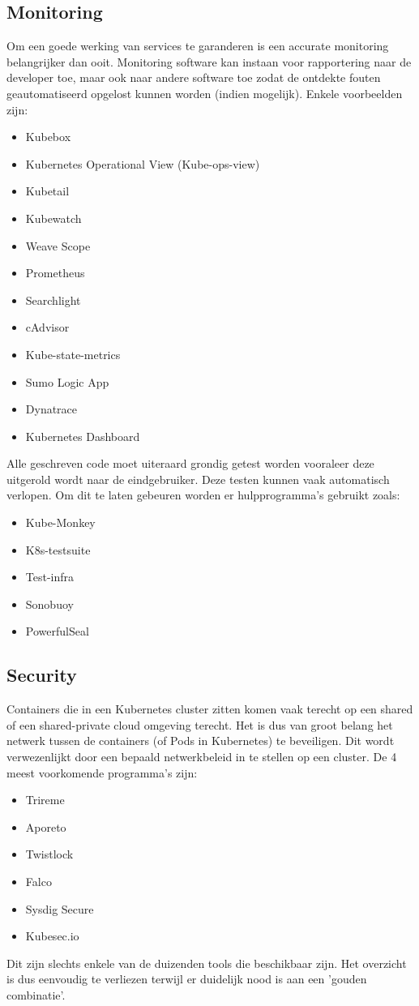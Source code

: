 \subsection{Monitoring}
Om een goede werking van services te garanderen is een accurate monitoring belangrijker dan ooit. Monitoring software kan instaan voor rapportering naar de developer toe, maar ook naar andere software toe zodat de ontdekte fouten geautomatiseerd opgelost kunnen worden (indien mogelijk). Enkele voorbeelden zijn:
\begin{itemize}
    \item Kubebox
    \item Kubernetes Operational View (Kube-ops-view)
    \item Kubetail
    \item Kubewatch
    \item Weave Scope
    \item Prometheus
    \item Searchlight
    \item cAdvisor
    \item Kube-state-metrics
    \item Sumo Logic App
    \item Dynatrace
    \item Kubernetes Dashboard
\end{itemize}
Alle geschreven code moet uiteraard grondig getest worden vooraleer deze uitgerold wordt naar de eindgebruiker. Deze testen kunnen vaak automatisch verlopen. Om dit te laten gebeuren worden er hulpprogramma's gebruikt zoals:
\begin{itemize}
    \item Kube-Monkey
    \item K8s-testsuite
    \item Test-infra
    \item Sonobuoy
    \item PowerfulSeal
\end{itemize}
\subsection{Security}
Containers die in een Kubernetes cluster zitten komen vaak terecht op een shared of een shared-private cloud omgeving terecht. Het is dus van groot belang het netwerk tussen de containers (of Pods in Kubernetes) te beveiligen. Dit wordt verwezenlijkt door een bepaald netwerkbeleid in te stellen op een cluster. De 4 meest voorkomende programma's zijn:
\begin{itemize}
    \item Trireme
    \item Aporeto
    \item Twistlock
    \item Falco
    \item Sysdig Secure
    \item Kubesec.io
\end{itemize}  
Dit zijn slechts enkele van de duizenden tools die beschikbaar zijn. Het overzicht is dus eenvoudig te verliezen terwijl er duidelijk nood is aan een 'gouden combinatie'.

